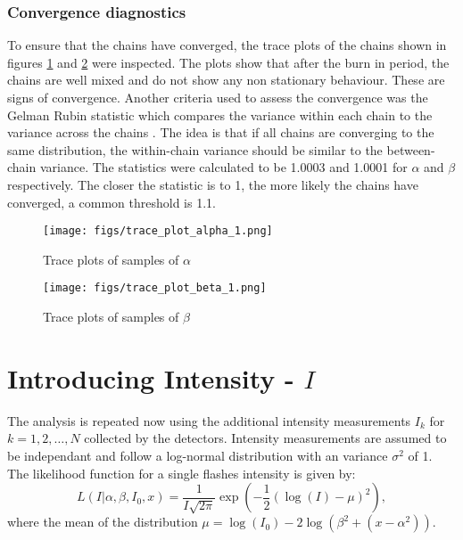 \documentclass[11pt]{article}
\begin{document}
\subsubsection{Convergence diagnostics}
To ensure that the chains have converged, the trace plots of the chains shown in figures \ref{fig:trace_plots_alpha_1} and \ref{fig:trace_plots_beta_1} were inspected. The plots show that after the burn in period, the chains are well mixed and do not show any non stationary behaviour. These are signs of convergence. Another criteria used to assess the convergence was the Gelman Rubin statistic which compares the variance within each chain to the variance across the chains \cite{GelmanRubin1992}. The idea is that if all chains are converging to the same distribution, the within-chain variance should be similar to the between-chain variance. The statistics were calculated to be 1.0003 and 1.0001 for $\alpha$ and $\beta$ respectively. The closer the statistic is to 1, the more likely the chains have converged, a common threshold is 1.1.

\begin{figure}[H]
    \centering
    \texttt{[image: figs/trace\_plot\_alpha\_1.png]}
    \caption{Trace plots of samples of $\alpha$}
    \label{fig:trace_plots_alpha_1}
\end{figure}

\begin{figure}[H]
    \centering
    \texttt{[image: figs/trace\_plot\_beta\_1.png]}
    \caption{Trace plots of samples of $\beta$}
    \label{fig:trace_plots_beta_1}
\end{figure}
\section{Introducing Intensity - $I$}
The analysis is repeated now using the additional intensity measurements $I_k$ for $k = 1, 2, \ldots, N$ collected by the detectors. Intensity measurements are assumed to be independant and follow a log-normal distribution with an variance $\sigma^2$ of 1. The likelihood function for a single flashes intensity is given by:
\begin{equation}
    L(I|\alpha,\beta, I_0, x) = \frac{1}{I\sqrt{2\pi}} \exp\left(-\frac{1}{2} \left( \log(I) - \mu\right)^2 \right),
    \label{eq:likelihood_intensity}
\end{equation}
where the mean of the distribution $\mu = \log(I_0) - 2\log{\left(\beta^2+(x-\alpha^2)\right)}$.
\end{document}
